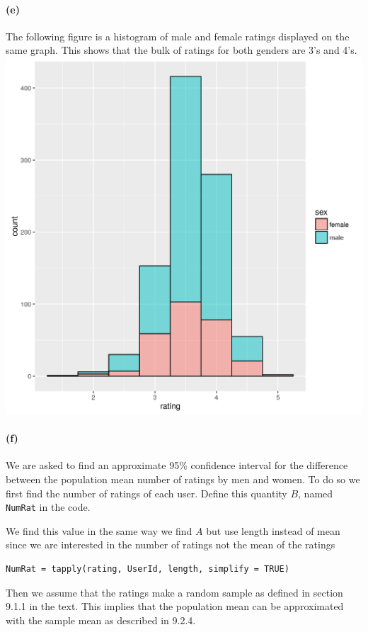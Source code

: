 \documentclass[fleqn]{article}
\begin{document}
	\paragraph{(e)}
		The following figure is a histogram of male and female ratings displayed on the same graph. This shows that the bulk of ratings for both genders are 3's and 4's.\\
		\includegraphics{plot.png} 

	 
	\paragraph{(f)}
		We are asked to find an approximate 95\% confidence interval for the difference between the population mean number of ratings by men and women. To do so we first find the number of ratings of each user. Define this quantity $B$, named \texttt{NumRat} in the code.

		We find this value in the same way we find $A$ but use length instead of mean since we are interested in the number of ratings not the mean of the ratings

		\begin{verbatim}NumRat = tapply(rating, UserId, length, simplify = TRUE)\end{verbatim}

		Then we assume that the ratings make a random sample as defined in section 9.1.1 in the text.
		This implies that the population mean can be approximated with the sample mean as described in 9.2.4.
\end{document}
